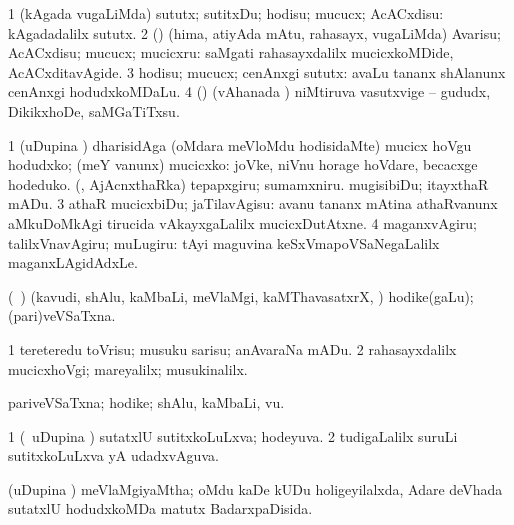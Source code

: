 \noindent
\gl{\sakirx}
\bmng
\bnum
\num{1} (kAgada \mo vugaLiMda) sututx; sutitxDu; hodisu; mucucx; AcACxdisu:  kAgadadalilx sututx. 
\num{2} (\rUpa) (hima, atiyAda mAtu, rahasayx, \mo vugaLiMda) Avarisu; AcACxdisu; mucucx; mucicxru:  saMgati rahasayxdalilx mucicxkoMDide, AcACxditavAgide. 
\num{3} hodisu; mucucx; cenAnxgi sututx:  avaLu tananx shAlanunx cenAnxgi hodudxkoMDaLu. 
\num{4} (\ashi) (vAhanada \vi) niMtiruva vasutxvige -- gududx, DikikxhoDe, saMGaTiTxsu. 
\enum
\emng

\noindent
\gl{\pagu}
\expl{}
\bmng
\bnum
\num{1}  (uDupina \vi) dharisidAga (oMdara meVloMdu hodisidaMte) mucicx hoVgu 
  
\banum
{} hodudxko; (meY \mo vanunx) mucicxko:  joVke, niVnu horage hoVdare, becacxge hodeduko. 
 (\ashi, AjAcnxthaRka) tepapxgiru; sumamxniru. 
 mugisibiDu; itayxthaR mADu. 
\eanum
\numie
\num{3}  athaR mucicxbiDu; jaTilavAgisu:  avanu tananx mAtina athaRvanunx aMkuDoMkAgi tirucida vAkayxgaLalilx mucicxDutAtxne. 
\num{4}  maganxvAgiru; talilxVnavAgiru; muLugiru:  tAyi maguvina keSxVmapoVSaNegaLalilx maganxLAgidAdxLe. 
\enum
\emng
\eentry

\bentry
{} 
\gl{\nA}
\expl{}
\bmng
(\sA\ \bava) (kavudi, shAlu, kaMbaLi, meVlaMgi, kaMThavasatxrX, \mo) hodike(gaLu); (pari)veVSaTxna. 
\emng

\noindent
\gl{\pagu}
\expl{}
\bmng
\bnum
\num{1}  tereteredu toVrisu; musuku sarisu; anAvaraNa mADu. 
\num{2}  rahasayxdalilx mucicxhoVgi; mareyalilx; musukinalilx. 
\enum
\emng
\eentry

\bentry 
{} 
\gl{\nA}
\expl{}
\bmng
pariveVSaTxna; hodike; shAlu, kaMbaLi, \mo vu. 
\emng
\eentry

\bentry 
{} 
\gl{\gu}
\expl{}
\bmng
\bnum
\num{1} (\kanmu\ uDupina \vi) sutatxlU sutitxkoLuLxva; hodeyuva. 
\num{2} tudigaLalilx suruLi sutitxkoLuLxva yA udadxvAguva. 
\enum
\emng
\eentry

\bentry
{} 
\gl{\gu}
\expl{}
\bmng
(uDupina \vi) meVlaMgiyaMtha; oMdu kaDe kUDu holigeyilalxda, Adare deVhada sutatxlU hodudxkoMDa matutx BadarxpaDisida. 
\emng
\eentry

